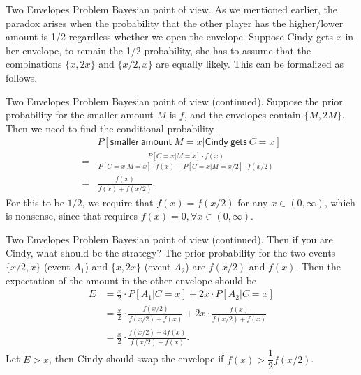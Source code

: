 \documentclass[hyperref={pdfpagelabels=false}]{beamer}
\newcommand{\U}{\mathsf}
\newcommand{\structb}[1]{\textcolor[rgb]{0.2,0.2,0.7}{#1}}
\begin{document}
%
\begin{frame}{Two Envelopes Problem}
    \justifying
    \structb{Bayesian point of view.} As we mentioned earlier, the paradox arises when the probability that the other player has the higher/lower amount is 1/2 regardless whether we open the envelope. Suppose Cindy gets $x$ in her envelope, to remain the 1/2 probability, she has to assume that the combinations $\{x, 2x\}$ and $\{x/2, x\}$ are equally likely. This can be formalized as follows.
\end{frame}
%
\begin{frame}{Two Envelopes Problem}
    \justifying
    \structb{Bayesian point of view (continued).} Suppose the prior probability for the smaller amount $M$ is $f$, and the envelopes contain $\{M, 2M\}$. Then we need to find the conditional probability
    \begin{align*}
        & P[\U{smaller\ amount\ } M = x|\U{Cindy\ gets\ } C = x] \\
        = & \frac{P[C = x|M = x] \cdot f(x)}{P[C = x|M = x]\cdot f(x) + P[C = x|M = x/2]\cdot f(x/2)} \\
        = & \frac{f(x)}{f(x) + f(x/2)}.
    \end{align*}
    For this to be $1/2$, we require that $f(x) = f(x/2)$ for any $x\in (0, \infty)$, which is nonsense, since that requires $f(x) = 0, \forall x\in (0, \infty)$.
\end{frame}
%
\begin{frame}{Two Envelopes Problem}
    \justifying
    \structb{Bayesian point of view (continued).} Then if you are Cindy, what should be the strategy? The prior probability for the two events $\{x/2, x\}$ (event $A_1$) and $\{x, 2x\}$ (event $A_2$) are $f(x/2)$ and $f(x)$. Then the expectation of the amount in the other envelope should be
    \begin{align*}
        E & = \frac{x}{2}\cdot P[A_1|C = x] + 2x\cdot P[A_2|C = x] \\
        & = \frac{x}{2} \cdot \frac{f(x/2)}{f(x/2) + f(x)} + 2x \cdot \frac{f(x)}{f(x/2) + f(x)} \\
        & = \frac{x}{2}\cdot \frac{f(x/2) + 4f(x)}{f(x/2) + f(x)}.
    \end{align*}
    Let $E > x$, then Cindy should swap the envelope if $f(x) > \dfrac{1}{2}f(x/2)$.
\end{frame}
%
\end{document}
